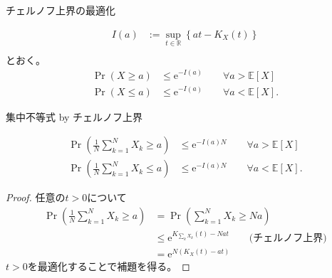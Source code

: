 \documentclass[lualatex,handout]{beamer}
\newcommand{\expt}[1]{\mathbb{E}\left[#1\right]}
\theoremstyle{definition}
\begin{document}
\begin{frame}{チェルノフ上界の最適化}
\begin{theorem}
\begin{align*}
I(a) &:= \sup_{t \in\mathbb{R}}\left\{at - K_X(t)\right\}\\
\end{align*}
とおく。
\begin{align*}
\Pr(X\ge a)&\le \mathrm{e}^{-I(a)}\qquad\forall a>\expt{X}\\
\Pr(X\le a)&\le \mathrm{e}^{-I(a)}\qquad\forall a<\expt{X}.
\end{align*}
\end{theorem}
\end{frame}

\begin{frame}{集中不等式 by チェルノフ上界}
\begin{lemma}
\begin{align*}
\Pr\left(\frac1N\sum_{k=1}^N X_k\ge a\right) &\le \mathrm{e}^{-I(a)N}\qquad\forall a>\expt{X}\\
\Pr\left(\frac1N\sum_{k=1}^N X_k\le a\right) &\le \mathrm{e}^{-I(a)N}\qquad\forall a<\expt{X}.
\end{align*}
\end{lemma}
\begin{proof}
\small
任意の$t>0$について
\begin{align*}
\Pr\left(\frac1N\sum_{k=1}^N X_k\ge a\right) &=
\Pr\left(\sum_{k=1}^N X_k\ge Na\right)\\
&\le\mathrm{e}^{K_{\sum_k X_k}(t) - Nat}\qquad\text{(チェルノフ上界)}\\
&=\mathrm{e}^{N(K_X(t) - at)}
\end{align*}
$t>0$を最適化することで補題を得る。
\end{proof}
\end{frame}
\end{document}

